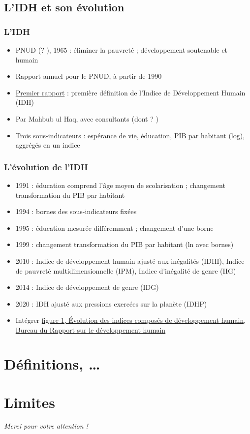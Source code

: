 \documentclass[french]{beamer}
\begin{document}
\subsection{L’IDH et son évolution}
\begin{frame}
	\frametitle{L’IDH}
	\begin{itemize}
		\item PNUD (? ), 1965 : éliminer la pauvreté ; développement soutenable et humain
		\item Rapport annuel pour le PNUD, à partir de 1990
		\item \href{https://hdr.undp.org/content/human-development-report-1990}{Premier rapport} : première définition de l’Indice de Développement Humain (IDH)
		\item Par Mahbub ul Haq, avec consultants (dont ? \onslide<3->{Amartya Sen})
		\item Trois sous-indicateurs : espérance de vie, éducation, PIB par habitant (log), aggrégés en un indice
	\end{itemize}
\end{frame}

\begin{frame}
	\frametitle{L’évolution de l’IDH}
	\begin{itemize}
		\item 1991 : éducation comprend l’âge moyen de scolarisation ; changement transformation du PIB par habitant
		\item 1994 : bornes des sous-indicateurs fixées
		\item 1995 : éducation mesurée différemment ; changement d’une borne
		\item 1999 : changement transformation du PIB par habitant (ln avec bornes)
		\item 2010 : Indice de développement humain ajusté aux inégalités (IDHI), Indice de pauvreté multidimensionnelle (IPM), Indice d’inégalité de genre (IIG)
		\item 2014 : Indice de développement de genre (IDG)
		\item 2020 : IDH ajusté aux pressions exercées sur la planète (IDHP) %
    \item Intégrer \href{https://hdr.undp.org/system/files/documents/2018humandevelopmentstatisticalupdatefr.pdf}{figure 1, Évolution des indices composés de développement humain, Bureau du Rapport sur le développement humain}
	\end{itemize}
\end{frame}

\section{Définitions, …}

\section{Limites}

\begin{frame}[plain]
	\addtocounter{framenumber}{-1}
	\begin{center}
		\huge
		\textit{Merci pour votre attention !}
	\end{center}
\end{frame}
\end{document}
